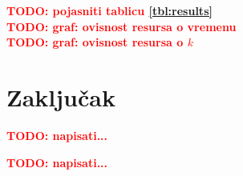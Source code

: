 \documentclass[times, utf8, seminar, numeric]{fer}
\newcommand\todo[1]{\textbf{\textcolor{red}{TODO: #1}}}
\begin{document}
\todo{pojasniti tablicu \ref{tbl:results}} \\
\todo{graf: ovisnost resursa o vremenu} \\
\todo{graf: ovisnost resursa o $k$}

\chapter{Zaključak}
\todo{napisati...}




\begin{sazetak}
  \todo{napisati...}

\end{sazetak}
\end{document}
